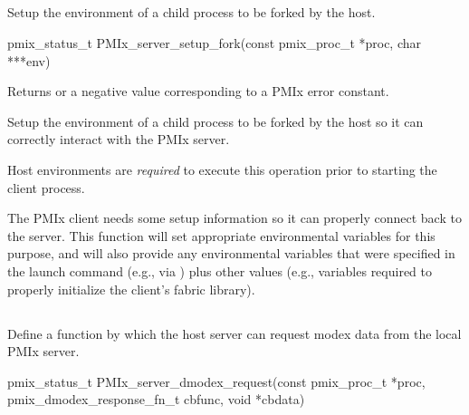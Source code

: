 \subsection{}

\summary

Setup the environment of a child process to be forked by the host.

\format

\cspecificstart
\begin{codepar}
pmix_status_t
PMIx_server_setup_fork(const pmix_proc_t *proc,
                        char ***env)
\end{codepar}
\cspecificend

\begin{arglist}
\end{arglist}

Returns  or a negative value corresponding to a PMIx error constant.

\descr

Setup the environment of a child process to be forked by the host so it can correctly interact with the PMIx server.

\advicermstart
Host environments are \textit{required} to execute this operation prior to starting the client process.
\advicermend

The \ac{PMIx} client needs some setup information so it can properly connect back to the server.
This function will set appropriate environmental variables for this purpose, and will also provide any environmental variables that were specified in the launch command (e.g., via ) plus other values (e.g., variables required to properly initialize the client's fabric library).


\subsection{}

\summary

Define a function by which the host server can request modex data from the local PMIx server.

\format

\cspecificstart
\begin{codepar}
pmix_status_t PMIx_server_dmodex_request(const pmix_proc_t *proc,
                        pmix_dmodex_response_fn_t cbfunc,
                        void *cbdata)
\end{codepar}
\cspecificend

